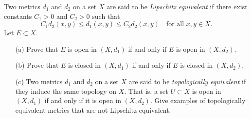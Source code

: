 \begin{problem}[21pts]
  Two metrics $d_1$ and $d_2$ on a set $X$ are said to be \emph{Lipschitz equivalent} if there exist constants $C_1>0$ and $C_2>0$ such that
\[
C_1 d_2(x,y) \leq d_1(x,y) \leq C_2 d_2(x,y) \quad \text{for all } x,y \in X.
\]
Let $E \subset X$.
\begin{enumerate}
  \item[(a)] Prove that $E$ is open in $(X,d_1)$ if and only if $E$ is open in $(X,d_2)$.
  \item[(b)] Prove that $E$ is closed in $(X,d_1)$ if and only if $E$ is closed in $(X,d_2)$.
  \item[(c)] Two metrics $d_1$ and $d_2$ on a set $X$ are said to be \emph{topologically equivalent} if they induce the same topology on $X$. That is, a set $U \subset X$ is open in $(X,d_1)$ if and only if it is open in $(X,d_2)$. Give examples of topologically equivalent metrics that are not Lipschitz equivalent.
\end{enumerate}  
\end{problem}
